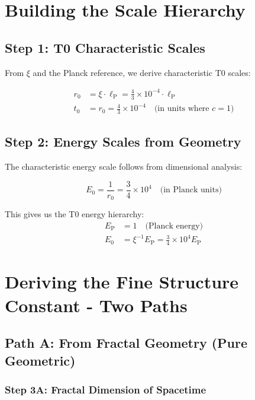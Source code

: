 \documentclass[12pt,a4paper]{article}
\newcommand{\lP}{\ell_{\text{P}}}
\newcommand{\EP}{E_{\text{P}}}
\newcommand{\rzero}{r_0}
\newcommand{\tzero}{t_0}
\newcommand{\Ezero}{E_0}
\newcommand{\xipar}{\xi}  %
\begin{document}
	\section{Building the Scale Hierarchy}
	
	\subsection{Step 1: T0 Characteristic Scales}
	
	From $\xipar$ and the Planck reference, we derive characteristic T0 scales:
	
	\begin{align}
		\rzero &= \xipar \cdot \lP = \frac{4}{3} \times 10^{-4} \cdot \lP \\
		\tzero &= \rzero = \frac{4}{3} \times 10^{-4} \quad \text{(in units where } c=1)
	\end{align}
	
	\subsection{Step 2: Energy Scales from Geometry}
	
	The characteristic energy scale follows from dimensional analysis:
	
	\begin{equation}
		\Ezero = \frac{1}{\rzero} = \frac{3}{4} \times 10^{4} \quad \text{(in Planck units)}
	\end{equation}
	
	This gives us the T0 energy hierarchy:
	\begin{align}
		\EP &= 1 \quad \text{(Planck energy)} \\
		\Ezero &= \xipar^{-1} \EP = \frac{3}{4} \times 10^{4} \EP
	\end{align}
	
	\section{Deriving the Fine Structure Constant - Two Paths}
	
	\subsection{Path A: From Fractal Geometry (Pure Geometric)}
	
	\subsubsection{Step 3A: Fractal Dimension of Spacetime}
	
\end{document}
